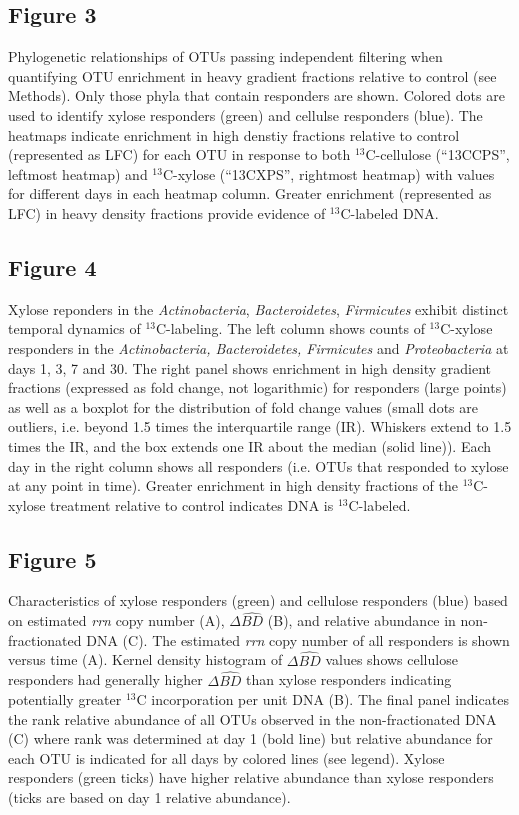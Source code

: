 \subsection{Figure 3}
Phylogenetic relationships of OTUs passing independent filtering when quantifying OTU enrichment in heavy gradient fractions relative to control (see Methods). Only those phyla that contain responders are shown. Colored dots are used to identify xylose responders (green) and cellulse responders (blue). The heatmaps indicate enrichment in high denstiy fractions relative to control (represented as LFC) for each OTU in response to both $^{13}$C-cellulose (``13CCPS'', leftmost heatmap) and $^{13}$C-xylose (``13CXPS'', rightmost heatmap) with values for different days in each heatmap column. Greater enrichment (represented as LFC) in heavy density fractions provide evidence of $^{13}$C-labeled DNA.  \subsection{Figure 4}
Xylose reponders in the \textit{Actinobacteria}, \textit{Bacteroidetes},
\textit{Firmicutes} exhibit distinct temporal dynamics of $^{13}$C-labeling.
The left column shows counts of $^{13}$C-xylose responders in the
\textit{Actinobacteria, Bacteroidetes, Firmicutes} and \textit{Proteobacteria}
at days 1, 3, 7 and 30. The right panel shows enrichment in high density
gradient fractions (expressed as fold change, not logarithmic) for responders
(large points) as well as a boxplot for the distribution of fold change values
(small dots are outliers, i.e. beyond 1.5 times the interquartile range (IR).
Whiskers extend to 1.5 times the IR, and the box extends one IR about the
median (solid line)). Each day in the right column shows all responders (i.e.
OTUs that responded to xylose at any point in time). Greater enrichment in high
density fractions of the $^{13}$C-xylose treatment relative to control indicates
DNA is $^{13}$C-labeled.
    
\subsection{Figure 5}
Characteristics of xylose responders (green) and cellulose responders (blue)
based on estimated \textit{rrn} copy number (A), $\Delta\hat{BD}$ (B), and
relative abundance in non-fractionated DNA (C). The estimated \textit{rrn} copy
number of all responders is shown versus time (A). Kernel density histogram of
$\Delta\hat{BD}$ values shows cellulose responders had generally higher
$\Delta\hat{BD}$ than xylose responders indicating potentially greater $^{13}$C
incorporation per unit DNA (B). The final panel indicates the rank relative
abundance of all OTUs observed in the non-fractionated DNA (C) where rank was
determined at day 1 (bold line) but relative abundance for each OTU is
indicated for all days by colored lines (see legend). Xylose responders (green
ticks) have higher relative abundance than xylose responders (ticks are based
on day 1 relative abundance).

